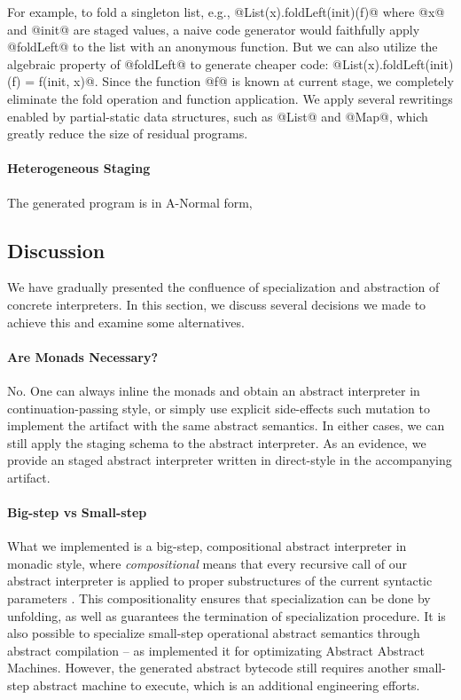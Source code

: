 For example, to fold a singleton list, e.g., @List(x).foldLeft(init)(f)@ where
@x@ and @init@ are staged values, a naive code generator would faithfully
apply @foldLeft@ to the list with an anonymous function. But we can also utilize
the algebraic property of @foldLeft@ to generate cheaper code:
@List(x).foldLeft(init)(f) = f(init, x)@.
Since the function @f@ is known at current stage, we completely eliminate the
fold operation and function application. We apply several rewritings enabled by
partial-static data structures, such as @List@ and @Map@, which greatly reduce
the size of residual programs.

\paragraph{Heterogeneous Staging} The generated program is in A-Normal form, 

\subsection{Discussion}

We have gradually presented the confluence of specialization and abstraction of
concrete interpreters. In this section, we discuss several decisions we made to
achieve this and examine some alternatives.

\paragraph{Are Monads Necessary?} No. One can always inline the monads and
obtain an abstract interpreter in continuation-passing style, or simply use
explicit side-effects such mutation to implement the artifact with the same
abstract semantics. In either cases, we can still apply the staging schema to
the abstract interpreter. As an evidence, we provide an staged abstract
interpreter written in direct-style in the accompanying artifact.

\paragraph{Big-step vs Small-step}

What we implemented is a big-step, compositional abstract interpreter in monadic
style, where \textit{compositional} means that every recursive call of our abstract
interpreter is applied to proper substructures of the current syntactic
parameters \cite{10.1007/3-540-61580-6_11}. This compositionality ensures that
specialization can be done by unfolding, as well as guarantees the termination
of specialization procedure. It is also possible to specialize small-step
operational abstract semantics through abstract compilation
\cite{Boucher:1996:ACN:647473.727587} -- as
\citet{Johnson:2013:OAA:2500365.2500604} implemented it for
optimizating Abstract Abstract Machines. However, the generated abstract
bytecode still requires another small-step abstract machine to execute, which is
an additional engineering efforts.

